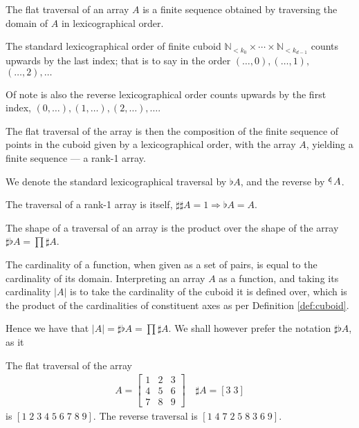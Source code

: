 \documentclass{DIKU-report-variant}
\newcommand\Nat{\mathbb{N}}
\newcommand\impl{\mathrel{\Rightarrow}}
\newcommand\tlaf{\mathop{\rotatebox[origin=c]{180}{$\flat$}}}
\begin{document}
\begin{definition}
  \label{def:flat}
  The flat traversal of an array \(A\) is a finite sequence obtained by
  traversing the domain of \(A\) in lexicographical order.
  
  The standard lexicographical order of finite cuboid
  \(\Nat_{<k_0} \times \cdots \times \Nat_{<k_{d-1}}\) counts upwards by the
  last index; that is to say in the order \((\dots,0), (\dots,1),\) \((\dots,2), \dots\)

  Of note is also the reverse lexicographical order counts upwards by the first
  index, \((0,\dots), (1,\dots), (2,\dots), \dots\).

  The flat traversal of the array is then the composition of the finite
  sequence of points in the cuboid given by a lexicographical order,
  with the array \(A\), yielding a finite sequence --- a rank-1 array.

  We denote the standard lexicographical traversal by \(\flat A\),
  and the reverse by \(\tlaf A\).

  The traversal of a rank-1 array is itself, \(\sharp \sharp A = 1 \impl \flat A = A\).

  The shape of a traversal of an array is the product over the shape
  of the array \(\sharp \flat A = \prod \sharp A\).
\end{definition}

\begin{observation}
  \label{ob:cardinality}
  The cardinality of a function, when given as a set of pairs, is equal to
  the cardinality of its domain. Interpreting an array \(A\) as a function, and
  taking its cardinality \(|A|\) is to take the cardinality of the cuboid it is
  defined over, which is the product of the cardinalities of constituent axes as
  per Definition \ref{def:cuboid}.

  Hence we have that \(|A| = \sharp \flat A = \prod \sharp A\).
  We shall however prefer the notation \(\sharp \flat A\), as it
\end{observation}

\begin{example}
  \label{ex:flat}
  The flat traversal of the array
  \begin{align*}
    A =
    \begin{bmatrix}
      1 & 2 & 3 \\
      4 & 5 & 6 \\
      7 & 8 & 9
    \end{bmatrix} \quad \sharp A = [3\; 3]
  \end{align*}
  is \([1\; 2\; 3\; 4\; 5\; 6\; 7\; 8\; 9]\).
  The reverse traversal is \([1\; 4\; 7\; 2\; 5\; 8\; 3\; 6\; 9]\).
\end{example}
\end{document}
